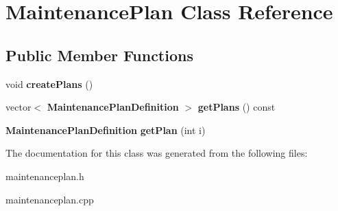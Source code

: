 \section{Maintenance\+Plan Class Reference}
\label{class_maintenance_plan}
\subsection*{Public Member Functions}
\begin{DoxyCompactItemize}
\item 
\mbox{\label{class_maintenance_plan_a555351f197ec5014d30d9cd8c6584df3}} 
void {\bfseries create\+Plans} ()
\item 
\mbox{\label{class_maintenance_plan_a81a17378e95c9ac711cfa859f66d3b38}} 
vector$<$ \textbf{ Maintenance\+Plan\+Definition} $>$ {\bfseries get\+Plans} () const
\item 
\mbox{\label{class_maintenance_plan_ad969560cf1685a55f4b7190ad99b3cdd}} 
\textbf{ Maintenance\+Plan\+Definition} {\bfseries get\+Plan} (int i)
\end{DoxyCompactItemize}


The documentation for this class was generated from the following files\+:\begin{DoxyCompactItemize}
\item 
maintenanceplan.\+h\item 
maintenanceplan.\+cpp\end{DoxyCompactItemize}
